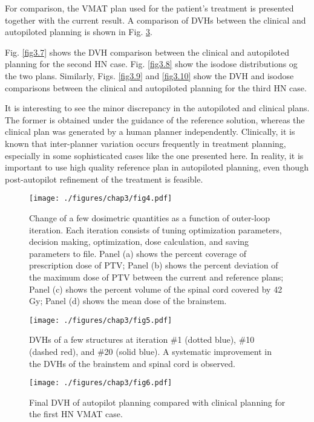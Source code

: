 For comparison, the VMAT plan used for the patient's treatment is presented together with the current result. A comparison of DVHs between the clinical and autopiloted planning is shown in Fig. \ref{fig3.6}. 

Fig. \ref{fig3.7} shows the DVH comparison between the clinical and autopiloted planning for the second HN case. Fig. \ref{fig3.8} show the isodose distributions og the two plans.  Similarly, Figs. \ref{fig3.9} and \ref{fig3.10} show the DVH and isodose comparisons between the clinical and autopiloted planning for the third HN case. 

It is interesting to see the minor discrepancy in the autopiloted and clinical plans. The former is obtained under the guidance of the reference solution, whereas the clinical plan was generated by a human planner independently. Clinically, it is known that inter-planner variation occurs frequently in treatment planning, especially in some sophisticated cases like the one presented here. In reality, it is important to use high quality reference plan in autopiloted planning, even though post-autopilot refinement of the treatment is feasible.

\begin{figure}
	\centering
	\texttt{[image: ./figures/chap3/fig4.pdf]}
	\caption{Change of a few dosimetric quantities as a function of outer-loop iteration. Each iteration consists of tuning optimization parameters, decision making, optimization, dose calculation, and saving parameters to file.  Panel (a) shows the percent coverage of prescription dose of PTV; Panel (b) shows the percent deviation of the maximum dose of PTV between the current and reference plans; Panel (c) shows the percent volume of the spinal cord covered by 42 Gy; Panel (d) shows the mean dose of the brainstem. 
	\label{fig3.4}}
    \end{figure}

\begin{figure}
	\centering
	\texttt{[image: ./figures/chap3/fig5.pdf]}
	\caption{DVHs of a few structures at iteration \#1 (dotted blue), \#10 (dashed red), and \#20 (solid blue).  A systematic improvement in the DVHs of the brainstem and spinal cord is observed. 
	\label{fig3.5}}
    \end{figure}

\begin{figure}
	\centering
	\texttt{[image: ./figures/chap3/fig6.pdf]}
	\caption{Final DVH of autopilot planning compared with clinical planning for the first HN VMAT case. 
	\label{fig3.6}}
    \end{figure}

